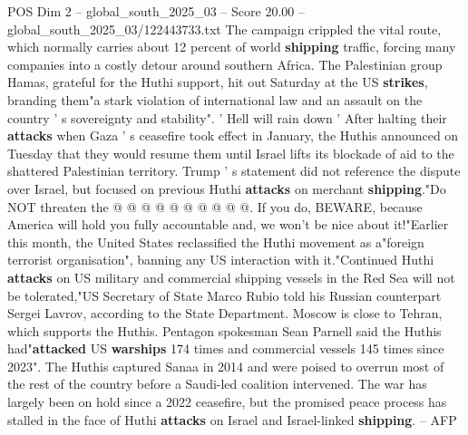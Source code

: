 \begin{textsample}{POS Dim 2 – global\_south\_2025\_03 – Score 20.00 – global\_south\_2025\_03/122443733.txt}
The campaign crippled the vital route, which normally carries about 12 percent of world \textbf{shipping} traffic, forcing many companies into a costly detour around southern Africa.
The Palestinian group Hamas, grateful for the Huthi support, hit out Saturday at the US \textbf{strikes}, branding them"a stark violation of international law and an assault on the country ' s sovereignty and stability". ' Hell will rain down ' After halting their \textbf{attacks} when Gaza ' s ceasefire took effect in January, the Huthis announced on Tuesday that they would resume them until Israel lifts its blockade of aid to the shattered Palestinian territory.
Trump ' s statement did not reference the dispute over Israel, but focused on previous Huthi \textbf{attacks} on merchant \textbf{shipping}."Do NOT threaten the @ @ @ @ @ @ @ @ @ @.
If you do, BEWARE, because America will hold you fully accountable and, we won't be nice about it!"Earlier this month, the United States reclassified the Huthi movement as a"foreign terrorist organisation", banning any US interaction with it."Continued Huthi \textbf{attacks} on US military and commercial shipping vessels in the Red Sea will not be tolerated,"US Secretary of State Marco Rubio told his Russian counterpart Sergei Lavrov, according to the State Department.
Moscow is close to Tehran, which supports the Huthis.
Pentagon spokesman Sean Parnell said the Huthis had"\textbf{attacked} US \textbf{warships} 174 times and commercial vessels 145 times since 2023".
The Huthis captured Sanaa in 2014 and were poised to overrun most of the rest of the country before a Saudi-led coalition intervened.
The war has largely been on hold since a 2022 ceasefire, but the promised peace process has stalled in the face of Huthi \textbf{attacks} on Israel and Israel-linked \textbf{shipping}. -- AFP

\end{textsample}
